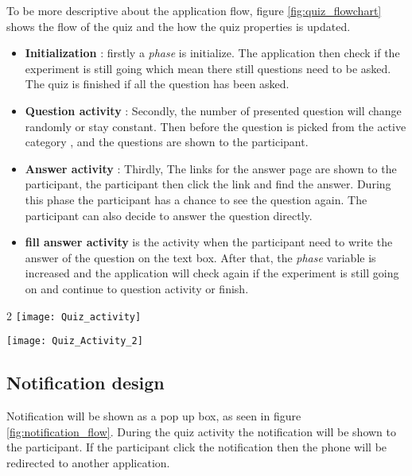 To be more descriptive about the application flow, figure \ref{fig:quiz_flowchart} shows the flow of the quiz and the how the quiz properties is updated.
\begin{itemize}
\item \textbf{Initialization} : firstly a \textit{phase} is initialize. The application then check if the experiment is still going which mean there still questions need to be asked. The quiz is finished if all the question has been asked.

\item \textbf{Question activity} : Secondly, the number of presented question will change randomly or stay constant.
Then before the question is picked from the active category , and the questions are shown to the participant.
\item \textbf{Answer activity} : Thirdly, The links for the answer page are shown to the participant, the participant then click the link and find the answer. During this phase the participant has a chance to see the question again. The participant can also decide to answer the question directly.
\item \textbf{fill answer activity} is the activity when the participant need to write the answer of the question on the text box. After that, the \textit{phase} variable is increased and the application will check again if the experiment is still going on and continue to question activity or finish.
\end{itemize}

\begin{figure*}[!t]
\begin{multicols}{2}
    \texttt{[image: Quiz\_activity]}\par
    \texttt{[image: Quiz\_Activity\_2]}\par
    \end{multicols}
\caption{Quiz flowchart}
\label{fig:quiz_flowchart}
\end{figure*}



\subsection{Notification design}

Notification will be shown as a pop up box, as seen in figure \ref{fig:notification_flow}.
During the quiz activity the notification will be shown to the participant. If the participant click the notification then the phone will be redirected to another application.

